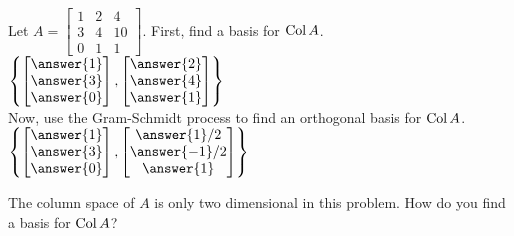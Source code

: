 \documentclass{ximera}
\newcommand{\Col}{\mathop{\rm Col}}
\begin{document}
  	  		                      \begin{question} 
  	  		                       Let $A = \begin{bmatrix} 1&2&4\\ 3&4&10\\ 0&1&1\end{bmatrix}$. First, find a basis for $\Col A$.\vspace{10pt}\\
  	  		                      	
  	  		                      	$\left\{   \begin{bmatrix} \answer{1}\\\answer{3}\\\answer{0}\end{bmatrix},  
  	  		                      	\begin{bmatrix} \answer{2}\\\answer{4}\\\answer{1}\end{bmatrix}
  	  		                                       \right\}$\vspace{10pt}\\
  	  		                      	
  	  		                      	
  	  		                      	Now, use the Gram-Schmidt process to find an orthogonal basis for $\Col A$.\\
  	  		                      	
  	  		                      	$\left\{   \begin{bmatrix} \answer{1}\\\answer{3}\\\answer{0}\end{bmatrix},  
  	  		                      	\begin{bmatrix} \answer{1}/2\\\answer{-1}/2\\\answer{1}\end{bmatrix}\right\}$
  	  		                      	
  	  		                      	\begin{hint}
  	  		                      		
  	  		                      		The column space of $A$ is only two dimensional in this problem. How do you find a basis for $\Col A$?
  	  		                      		\end{hint}
  	  		                      \end{question}
  
\end{document}
